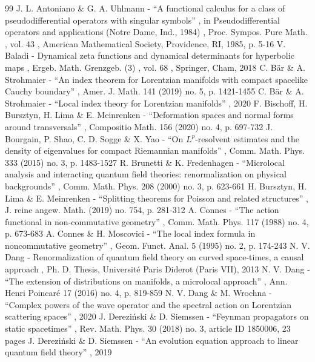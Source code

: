 \begin{thebibliography}{99}
 J. L. Antoniano \& G. A. Uhlmann - “A functional calculus for a class of pseudodifferential operators with singular symbols” , in Pseudodifferential operators and applications (Notre Dame, Ind., 1984) , Proc. Sympos. Pure Math. , vol. 43 , American Mathematical Society, Providence, RI, 1985, p. 5-16
 V. Baladi - Dynamical zeta functions and dynamical determinants for hyperbolic maps , Ergeb. Math. Grenzgeb. (3) , vol. 68 , Springer, Cham, 2018
 C. Bär \& A. Strohmaier - “An index theorem for Lorentzian manifolds with compact spacelike Cauchy boundary” , Amer. J. Math. 141 (2019) no. 5, p. 1421-1455
 C. Bär \& A. Strohmaier - “Local index theory for Lorentzian manifolds” , 2020
 F. Bischoff, H. Bursztyn, H. Lima \& E. Meinrenken - “Deformation spaces and normal forms around transversals” , Compositio Math. 156 (2020) no. 4, p. 697-732
 J. Bourgain, P. Shao, C. D. Sogge \& X. Yao - “On $L^p$-resolvent estimates and the density of eigenvalues for compact Riemannian manifolds” , Comm. Math. Phys. 333 (2015) no. 3, p. 1483-1527
 R. Brunetti \& K. Fredenhagen - “Microlocal analysis and interacting quantum field theories: renormalization on physical backgrounds” , Comm. Math. Phys. 208 (2000) no. 3, p. 623-661
 H. Bursztyn, H. Lima \& E. Meinrenken - “Splitting theorems for Poisson and related structures” , J. reine angew. Math. (2019) no. 754, p. 281-312
 A. Connes - “The action functional in non-commutative geometry” , Comm. Math. Phys. 117 (1988) no. 4, p. 673-683
 A. Connes \& H. Moscovici - “The local index formula in noncommutative geometry” , Geom. Funct. Anal. 5 (1995) no. 2, p. 174-243
 N. V. Dang - Renormalization of quantum field theory on curved space-times, a causal approach , Ph. D. Thesis, Université Paris Diderot (Paris VII), 2013
 N. V. Dang - “The extension of distributions on manifolds, a microlocal approach” , Ann. Henri Poincaré 17 (2016) no. 4, p. 819-859
 N. V. Dang \& M. Wrochna - “Complex powers of the wave operator and the spectral action on Lorentzian scattering spaces” , 2020
 J. Dereziński \& D. Siemssen - “Feynman propagators on static spacetimes” , Rev. Math. Phys. 30 (2018) no. 3, article ID 1850006, 23 pages
 J. Dereziński \& D. Siemssen - “An evolution equation approach to linear quantum field theory” , 2019

\end{thebibliography}
